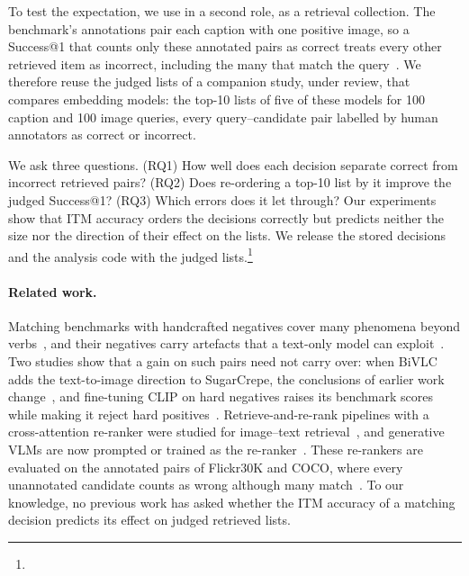 To test the expectation, we use \svo{} in a second role, as a retrieval collection. The benchmark's annotations pair each caption with one positive image, so a Success@1 that counts only these annotated pairs as correct treats every other retrieved item as incorrect, including the many that match the query~\cite{chun2022eccv,parekh2021crisscrossed}. We therefore reuse the judged lists of a companion study, under review, that compares embedding models: the top-10 lists of five of these models for 100 caption and 100 image queries, every query--candidate pair labelled by human annotators as correct or incorrect.

We ask three questions. (RQ1) How well does each decision separate correct from incorrect retrieved pairs? (RQ2) Does re-ordering a top-10 list by it improve the judged Success@1? (RQ3) Which errors does it let through? Our experiments show that ITM accuracy orders the decisions correctly but predicts neither the size nor the direction of their effect on the lists. We release the stored decisions and the analysis code with the judged lists.\footnote{\repolink}

\paragraph{Related work.}
Matching benchmarks with handcrafted negatives cover many phenomena beyond verbs~\cite{parcalabescu2021valse,thrush2022winoground,ma2023crepe,yuksekgonul2023when}, and their negatives carry artefacts that a text-only model can exploit~\cite{hsieh2023sugarcrepe}. Two studies show that a gain on such pairs need not carry over: when BiVLC adds the text-to-image direction to SugarCrepe, the conclusions of earlier work change~\cite{miranda2024bivlc}, and fine-tuning CLIP on hard negatives raises its benchmark scores while making it reject hard positives~\cite{kamath2024hardpositive}. Retrieve-and-re-rank pipelines with a cross-attention re-ranker were studied for image--text retrieval~\cite{miech2021thinking,geigle2022retrieve}, and generative VLMs are now prompted or trained as the re-ranker~\cite{lin2025mmembed,liu2025lamra,qwen3vlembedding2026}. These re-rankers are evaluated on the annotated pairs of Flickr30K and COCO, where every unannotated candidate counts as wrong although many match~\cite{parekh2021crisscrossed,chun2022eccv}. To our knowledge, no previous work has asked whether the ITM accuracy of a matching decision predicts its effect on judged retrieved lists.

